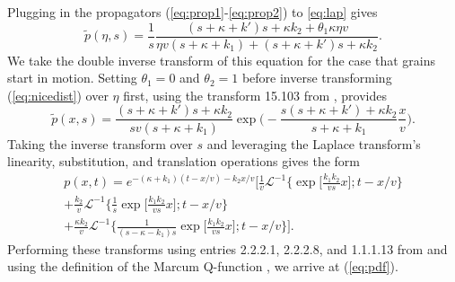\documentclass[]{agujournal2018}
\newcommand\be{\begin{equation}}
\newcommand\ee{\end{equation}}
\newcommand\El{\mathcal{L}}
\begin{document}
Plugging in the propagators (\ref{eq:prop1}-\ref{eq:prop2}) to \ref{eq:lap} gives 
\be \tilde{p}(\eta,s) = \frac{1}{s}\frac{(s+\kappa + k')s + \kappa k_2 + \theta_1\kappa \eta v}{\eta v(s+\kappa+k_1)+(s+\kappa+k')s + \kappa k_2}.\label{eq:nicedist}\ee
We take the double inverse transform of this equation for the case that grains start in motion.
Setting $\theta_1=0$ and $\theta_2=1$ before inverse transforming (\ref{eq:nicedist}) over $\eta$ first, using the transform 15.103 from \citet{Arfken1985}, provides
\be \tilde{p}(x,s) = \frac{(s+\kappa+k')s+\kappa k_2}{sv(s+\kappa+k_1)}
\exp{\Big(-\frac{s(s+\kappa+k')+\kappa k_2}{s+\kappa+k_1}\frac{x}{v}\Big)}.\ee
Taking the inverse transform over $s$ and leveraging the Laplace transform's linearity, substitution, and translation operations \citep[e.g.][]{Arfken1985} gives the form
\begin{multline}
p(x,t) = e^{-(\kappa + k_1)(t-x/v)-k_2x/v}
\Big[\frac{1}{v}\El^{-1}\Big\{\exp\Big[\frac{k_1k_2}{vs}x\Big];t-x/v\Big\} \\
+ \frac{k_2}{v}\El^{-1}\Big\{\frac{1}{s}\exp\Big[\frac{k_1k_2}{vs}x\Big];t-x/v\Big\} \\
+ \frac{\kappa k_2}{v}\El^{-1}\Big\{\frac{1}{(s-\kappa-k_1)s}\exp\Big[\frac{k_1k_2}{vs}x\Big];t-x/v\Big\}\Big].
\end{multline}
Performing these transforms using entries 2.2.2.1, 2.2.2.8, and 1.1.1.13 from \citet{Prudnikov1992a} and using the definition of the Marcum Q-function \citep[e.g.][]{Temme1996}, we arrive at (\ref{eq:pdf}).
\end{document}
